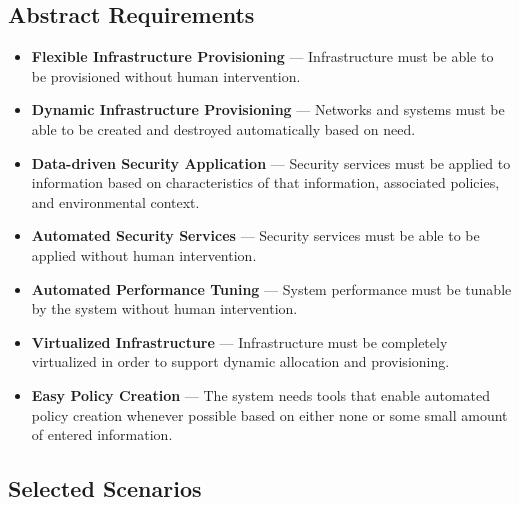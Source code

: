 \documentclass[10pt,letterpaper]{article}
\begin{document}
\subsection{Abstract Requirements}
\label{sec:requirements}
\begin{itemize}
\item {\bf Flexible Infrastructure Provisioning} --- Infrastructure must be able to be provisioned without human intervention.

\item {\bf Dynamic Infrastructure Provisioning} --- Networks and systems must be able to be created and destroyed automatically based on need.

\item {\bf Data-driven Security Application} --- Security services must be applied to information based on characteristics of that information, associated policies, and environmental context.

\item {\bf Automated Security Services} --- Security services must be able to be applied without human intervention.

\item {\bf Automated Performance Tuning} --- System performance must be tunable by the system without human intervention.

\item {\bf Virtualized Infrastructure} --- Infrastructure must be completely virtualized in order to support dynamic allocation and provisioning.

\item {\bf Easy Policy Creation} --- The system needs tools that enable automated policy creation whenever possible based on either none or some small amount of entered information.
\end{itemize}

\subsection{Selected Scenarios}
\label{sec:scenarios}
\end{document}
